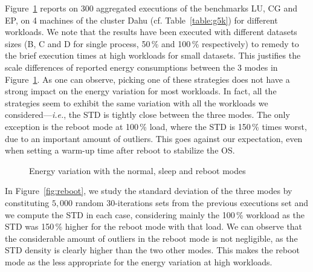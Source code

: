 Figure~\ref{fig:running-process} reports on $300$ aggregated executions of the  benchmarks \textsf{LU}, \textsf{CG} and \textsf{EP}, on 4 machines of the cluster \textsf{Dahu} (cf. Table~\ref{table:g5k}) for different workloads.
We note that the results have been executed with different datasets sizes (\textsf{B}, \textsf{C} and \textsf{D} for single process, 50\,\% and 100\,\% respectively) to remedy to the brief execution times at high workloads for small datasets.
This justifies the scale differences of reported energy consumptions between the 3 modes in Figure~\ref{fig:running-process}.
As one can observe, picking one of these strategies does not have a strong impact on the energy variation for most workloads.
In fact, all the strategies seem to exhibit the same variation with all the workloads we considered---\emph{i.e.}, the STD is tightly close between the three modes.
The only exception is the \textsf{reboot} mode at 100\,\% load, where the STD is 150\,\% times worst, due to an important amount of outliers.
This goes against our expectation, even when setting a warm-up time after reboot to stabilize the OS.

\begin{figure}
    \caption{Energy variation with the \textsf{normal}, \textsf{sleep} and \textsf{reboot} modes}\label{fig:running-process}
\end{figure}

In Figure~\ref{fig:reboot}, we study the standard deviation of the three modes by constituting $5,000$ random 30-iterations sets from the previous executions set and we compute the STD in each case, considering mainly the 100\,\% workload as the STD was 150\,\% higher for the \textsf{reboot} mode with that load.
We can observe that the considerable amount of outliers in the \textsf{reboot} mode is not negligible, as the STD density is clearly higher than the two other modes.
This makes the \textsf{reboot} mode as the less appropriate for the energy variation at high workloads.

